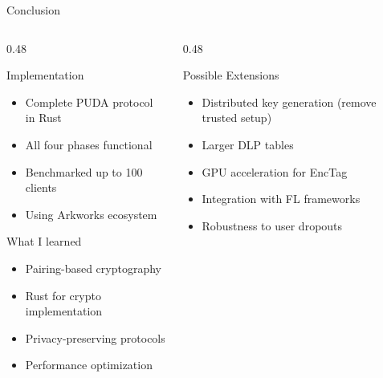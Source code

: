 \documentclass[aspectratio=169,10pt]{beamer}
\begin{document}
\begin{frame}{Conclusion}
    \begin{columns}[T]
        \begin{column}{0.48\textwidth}
            \begin{block}{Implementation}
                \begin{itemize}
                    \item Complete PUDA protocol in Rust
                    \item All four phases functional
                    \item Benchmarked up to 100 clients
                    \item Using Arkworks ecosystem
                \end{itemize}
            \end{block}

            \vspace{0.4em}

            \begin{block}{What I learned}
                \begin{itemize}
                    \item Pairing-based cryptography
                    \item Rust for crypto implementation
                    \item Privacy-preserving protocols
                    \item Performance optimization
                \end{itemize}
            \end{block}
        \end{column}
        \begin{column}{0.48\textwidth}
            \begin{block}{Possible Extensions}
                \begin{itemize}
                    \item Distributed key generation (remove trusted setup)
                    \item Larger DLP tables
                    \item GPU acceleration for EncTag
                    \item Integration with FL frameworks
                    \item Robustness to user dropouts
                \end{itemize}
            \end{block}


\end{column}
\end{columns}
\end{frame}
\end{document}
